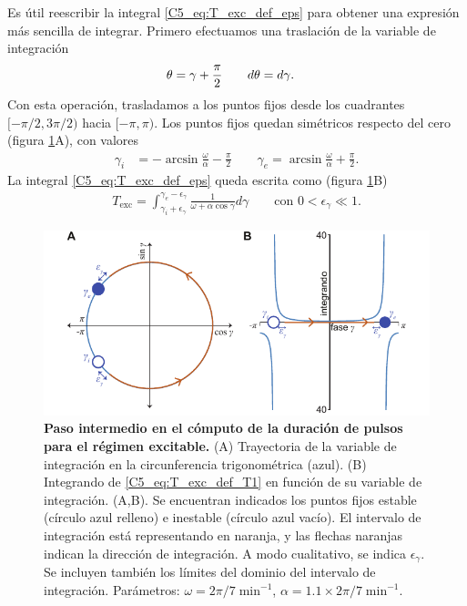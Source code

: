 \documentclass[./main.tex]{subfiles}
\begin{document}
Es útil reescribir la integral \ref{C5_eq:T_exc_def_eps} para obtener una expresión más sencilla de integrar. Primero efectuamos una traslación de la variable de integración \xx
\begin{align}
    \theta &= \gamma + \frac{\pi}{2} \qquad 
    d\theta = d\gamma. 
\end{align}
Con esta operación, trasladamos a los puntos fijos desde los cuadrantes $[-\pi/2,3\pi/2)$ hacia $[-\pi, \pi)$. Los puntos fijos quedan simétricos respecto del cero (figura \ref{C5_fig:T_exc_T1}A), con valores
\begin{align}
    \gamma_i &= -\arcsin{\frac{\omega}{\alpha}} - \frac{\pi}{2} \qquad
    \gamma_e = \arcsin{\frac{\omega}{\alpha}} + \frac{\pi}{2}.
\end{align}
La integral \ref{C5_eq:T_exc_def_eps} queda escrita como (figura \ref{C5_fig:T_exc_T1}B)
\begin{align}
    T_{\text{exc}} = \int_{\gamma_i+\epsilon_\gamma}^{\gamma_e-\epsilon_\gamma}  \frac{1}{\omega + \alpha \cos{\gamma}} d\gamma \qquad \text{con } 0 < \epsilon_\gamma \ll 1.
    \label{C5_eq:T_exc_def_T1}
\end{align}

 \begin{figure}
    \centering
    \includegraphics[width=1\columnwidth]{figures/chapter5/C5_T_exc_T1.pdf} 
    \caption{\textbf{Paso intermedio en el cómputo de la duración de pulsos para el régimen excitable.} (A) Trayectoria de la variable de integración en la circunferencia trigonométrica (azul). (B) Integrando de \ref{C5_eq:T_exc_def_T1} en función de su variable de integración. (A,B). Se encuentran indicados los puntos fijos estable \xxe (círculo azul relleno) e inestable \xxi (círculo azul vacío). El intervalo de integración está representando en naranja, y  las flechas naranjas indican la dirección de integración. A modo cualitativo, se indica $\epsilon_\gamma$. Se incluyen también los límites del dominio del intervalo de integración. Parámetros: $\omega=2\pi/7\;\text{min}^{-1}$, $\alpha = 1.1 \times 2\pi/7\;\text{min}^{-1}$.}
    \label{C5_fig:T_exc_T1}
\end{figure}
\end{document}
